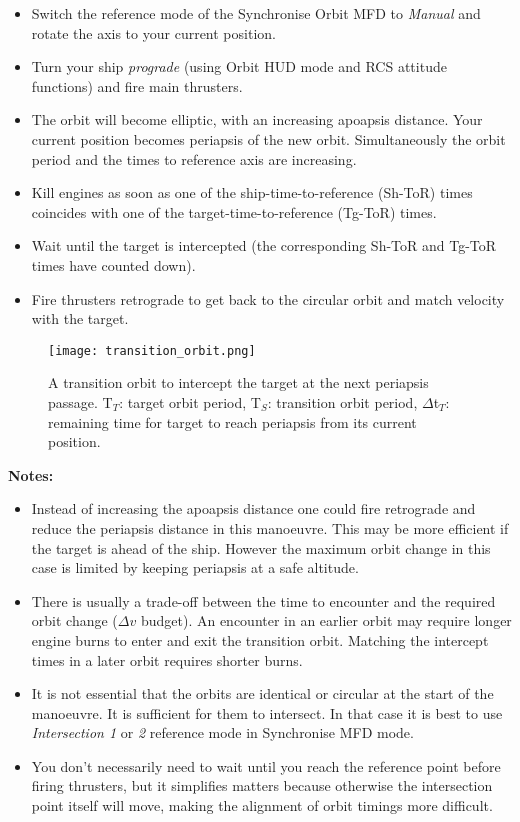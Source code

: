 \documentclass[Orbiter User Manual.tex]{subfiles}
\begin{document}
\begin{itemize}
\item Switch the reference mode of the Synchronise Orbit MFD to \textit{Manual} and rotate the axis to your current position.
\item Turn your ship \textit{prograde} (using Orbit HUD mode and RCS attitude functions) and fire main thrusters.
\item The orbit will become elliptic, with an increasing apoapsis distance. Your current position becomes periapsis of the new orbit. Simultaneously the orbit period and the times to reference axis are increasing.
\item Kill engines as soon as one of the ship-time-to-reference (Sh-ToR) times coincides with one of the target-time-to-reference (Tg-ToR) times.
\item Wait until the target is intercepted (the corresponding Sh-ToR and Tg-ToR times have counted down).
\item Fire thrusters retrograde to get back to the circular orbit and match velocity with the target.
\end{itemize}

\begin{figure}[H]
	\centering
	\texttt{[image: transition\_orbit.png]}
	\caption{A transition orbit to intercept the target at the next periapsis passage. T$_{T}$: target orbit period, T$_{S}$: transition orbit period, $\Delta$t$_{T}$: remaining time for target to reach periapsis from its current position.}
\end{figure}

\noindent
\textbf{Notes:}

\begin{itemize}
\item Instead of increasing the apoapsis distance one could fire retrograde and reduce the periapsis distance in this manoeuvre. This may be more efficient if the target is ahead of the ship. However the maximum orbit change in this case is limited by keeping periapsis at a safe altitude.
\item There is usually a trade-off between the time to encounter and the required orbit change ($\Delta v$ budget). An encounter in an earlier orbit may require longer engine burns to enter and exit the transition orbit. Matching the intercept times in a later orbit requires shorter burns.
\item It is not essential that the orbits are identical or circular at the start of the manoeuvre. It is sufficient for them to intersect. In that case it is best to use \textit{Intersection 1} or \textit{2} reference mode in Synchronise MFD mode.
\item You don't necessarily need to wait until you reach the reference point before firing thrusters, but it simplifies matters because otherwise the intersection point itself will move, making the alignment of orbit timings more difficult.
\end{itemize}
\end{document}
